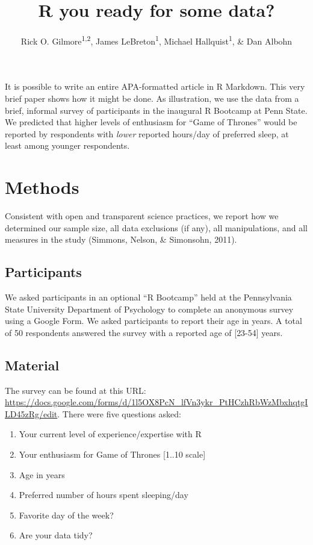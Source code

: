 \documentclass[english,man]{apa6}
\title{R you ready for some data?}
\author{Rick O. Gilmore\textsuperscript{1,2}, James LeBreton\textsuperscript{1}, Michael Hallquist\textsuperscript{1}, \& Dan Albohn}
\affiliation{
    \vspace{0.5cm}
          \textsuperscript{1} The Pennsylvania State University\\
          \textsuperscript{2} Databrary.org  }
\providecommand{\tightlist}{%
  \setlength{\itemsep}{0pt}\setlength{\parskip}{0pt}}
\theoremstyle{definition}
\theoremstyle{definition}
\theoremstyle{remark}
\begin{document}
\maketitle

\setcounter{secnumdepth}{0}



It is possible to write an entire APA-formatted article in R Markdown.
This very brief paper shows how it might be done. As illustration, we
use the data from a brief, informal survey of participants in the
inaugural R Bootcamp at Penn State. We predicted that higher levels of
enthusiasm for \enquote{Game of Thrones} would be reported by
respondents with \emph{lower} reported hours/day of preferred sleep, at
least among younger respondents.

\section{Methods}\label{methods}

Consistent with open and transparent science practices, we report how we
determined our sample size, all data exclusions (if any), all
manipulations, and all measures in the study (Simmons, Nelson, \&
Simonsohn, 2011).

\subsection{Participants}\label{participants}

We asked participants in an optional \enquote{R Bootcamp} held at the
Pennsylvania State University Department of Psychology to complete an
anonymous survey using a Google Form. We asked participants to report
their age in years. A total of 50 respondents answered the survey with a
reported age of {[}23-54{]} years.

\subsection{Material}\label{material}

The survey can be found at this URL:
\url{https://docs.google.com/forms/d/1l5OX8PcN_lfVn3ykr_PtHCzhRbWzMbxhqtgILD45zRg/edit}.
There were five questions asked:

\begin{enumerate}
\def\labelenumi{\arabic{enumi}.}
\tightlist
\item
  Your current level of experience/expertise with R
\item
  Your enthusiasm for Game of Thrones {[}1..10 scale{]}
\item
  Age in years
\item
  Preferred number of hours spent sleeping/day
\item
  Favorite day of the week?
\item
  Are your data tidy?
\end{enumerate}
\end{document}

